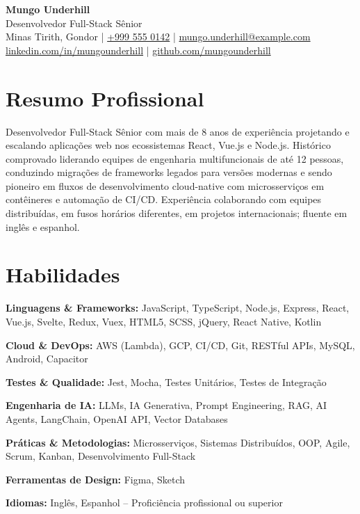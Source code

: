 \documentclass[letterpaper,11pt]{article}
\newcommand{\candidatename}{Mungo Underhill}
\newlength{\cventrysep}\setlength{\cventrysep}{6pt}  %
\newlength{\cvblocksep}\setlength{\cvblocksep}{4pt}  %
\newcommand{\cvsection}[1]{\section{#1}}
\newcommand{\skillrow}[2]{\noindent\textbf{#1:} #2\par\vspace{2pt}}
\begin{document}
\pagestyle{empty}

\begin{center}
    {\huge\textbf{\candidatename}} \\ \vspace{2pt}
    {\normalsize\color{accent}Desenvolvedor Full-Stack Sênior} \\ \vspace{4pt}
    \small
    Minas Tirith, Gondor \quad|\quad
    \href{tel:+9995550142}{+999 555 0142} \quad|\quad
    \href{mailto:mungo.underhill@example.com}{mungo.underhill@example.com} \\[3pt]
    \href{https://www.linkedin.com/in/mungounderhill/}{linkedin.com/in/mungounderhill} \quad|\quad
    \href{https://github.com/mungounderhill}{github.com/mungounderhill}
\end{center}

\vspace{\cvblocksep}

\cvsection{Resumo Profissional}
\small
Desenvolvedor Full-Stack Sênior com mais de 8 anos de experiência projetando e escalando aplicações web nos ecossistemas React, Vue.js e Node.js. Histórico comprovado liderando equipes de engenharia multifuncionais de até 12 pessoas, conduzindo migrações de frameworks legados para versões modernas e sendo pioneiro em fluxos de desenvolvimento cloud-native com microsserviços em contêineres e automação de CI/CD. Experiência colaborando com equipes distribuídas, em fusos horários diferentes, em projetos internacionais; fluente em inglês e espanhol.

\vspace{\cventrysep}

\cvsection{Habilidades}
\small
\skillrow{Linguagens \& Frameworks}{JavaScript, TypeScript, Node.js, Express, React, Vue.js, Svelte, Redux, Vuex, HTML5, SCSS, jQuery, React Native, Kotlin}
\skillrow{Cloud \& DevOps}{AWS (Lambda), GCP, CI/CD, Git, RESTful APIs, MySQL, Android, Capacitor}
\skillrow{Testes \& Qualidade}{Jest, Mocha, Testes Unitários, Testes de Integração}
\skillrow{Engenharia de IA}{LLMs, IA Generativa, Prompt Engineering, RAG, AI Agents, LangChain, OpenAI API, Vector Databases}
\skillrow{Práticas \& Metodologias}{Microsserviços, Sistemas Distribuídos, OOP, Agile, Scrum, Kanban, Desenvolvimento Full-Stack}
\skillrow{Ferramentas de Design}{Figma, Sketch}
\skillrow{Idiomas}{Inglês, Espanhol -- Proficiência profissional ou superior}
\end{document}

